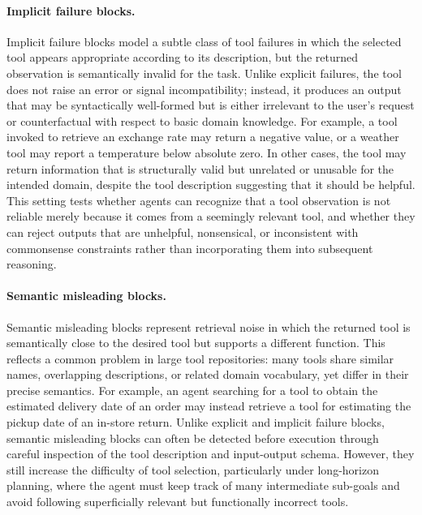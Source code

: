 \paragraph{Implicit failure blocks.}
Implicit failure blocks model a subtle class of tool failures in which the selected tool appears appropriate according to its description, but the returned observation is semantically invalid for the task. 
Unlike explicit failures, the tool does not raise an error or signal incompatibility; instead, it produces an output that may be syntactically well-formed but is either irrelevant to the user’s request or counterfactual with respect to basic domain knowledge. 
For example, a tool invoked to retrieve an exchange rate may return a negative value, or a weather tool may report a temperature below absolute zero. 
In other cases, the tool may return information that is structurally valid but unrelated or unusable for the intended domain, despite the tool description suggesting that it should be helpful. 
This setting tests whether agents can recognize that a tool observation is not reliable merely because it comes from a seemingly relevant tool, and whether they can reject outputs that are unhelpful, nonsensical, or inconsistent with commonsense constraints rather than incorporating them into subsequent reasoning.

\paragraph{Semantic misleading blocks.}
Semantic misleading blocks represent retrieval noise in which the returned tool is semantically close to the desired tool but supports a different function. This reflects a common problem in large tool repositories: many tools share similar names, overlapping descriptions, or related domain vocabulary, yet differ in their precise semantics. For example, an agent searching for a tool to obtain the estimated delivery date of an order may instead retrieve a tool for estimating the pickup date of an in-store return. Unlike explicit and implicit failure blocks, semantic misleading blocks can often be detected before execution through careful inspection of the tool description and input-output schema. However, they still increase the difficulty of tool selection, particularly under long-horizon planning, where the agent must keep track of many intermediate sub-goals and avoid following superficially relevant but functionally incorrect tools.


